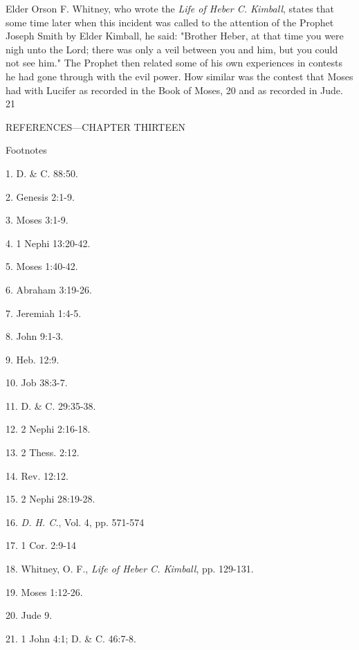 Elder Orson F. Whitney, who wrote the \textit{Life of Heber C. Kimball}, states that some time later
when this incident was called to the attention of the Prophet Joseph Smith by Elder Kimball,
he said: "Brother Heber, at that time you were nigh unto the Lord; there was only a veil
between you and him, but you could not see him." The Prophet then related some of his own
experiences in contests he had gone through with the evil power. How similar was the contest
that Moses had with Lucifer as recorded in the Book of Moses, 20 and as recorded in Jude.
21

\newpage
REFERENCES—CHAPTER THIRTEEN

Footnotes

1. D. \& C. 88:50.

2. Genesis 2:1-9.

3. Moses 3:1-9.

4. 1 Nephi 13:20-42.

5. Moses 1:40-42.

6. Abraham 3:19-26.

7. Jeremiah 1:4-5.

8. John 9:1-3.

9. Heb. 12:9.

10. Job 38:3-7.

11. D. \& C. 29:35-38.

12. 2 Nephi 2:16-18.

13. 2 Thess. 2:12.

14. Rev. 12:12.

15. 2 Nephi 28:19-28.

16. \textit{D. H. C.}, Vol. 4, pp. 571-574

17. 1 Cor. 2:9-14

18. Whitney, O. F., \textit{Life of Heber C. Kimball}, pp. 129-131.

19. Moses 1:12-26.

20. Jude 9.

21. 1 John 4:1; D. \& C. 46:7-8.

